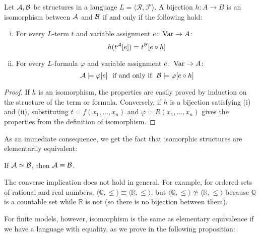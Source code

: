 \begin{proposition}
Let $\mathcal{A}, \mathcal{B}$ be structures in a language $L = \langle\mathcal{R}, \mathcal{F}\rangle$. A bijection $h\colon A \to B$ is an isomorphism between $\mathcal{A}$ and $\mathcal{B}$ if and only if the following hold:
\begin{enumerate}[(i)]
    \item For every $L$-term $t$ and variable assignment $e\colon \operatorname{Var} \to A$:
    $$
    h(t^{\mathcal{A}}[e]) = t^{\mathcal{B}}[e \circ h]
    $$
    \item For every $L$-formula $\varphi$ and variable assignment $e\colon \operatorname{Var} \to A$:
    $$
    \mathcal{A} \models \varphi[e]\ \text{ if and only if }\ \mathcal{B} \models \varphi[e \circ h]
    $$
\end{enumerate}
\end{proposition}
\begin{proof}
    If $h$ is an isomorphism, the properties are easily proved by induction on the structure of the term or formula. Conversely, if $h$ is a bijection satisfying (i) and (ii), substituting $t = f(x_1, \dots, x_n)$ and $\varphi = R(x_1, \dots, x_n)$ gives the properties from the definition of isomorphism.
\end{proof}

As an immediate consequence, we get the fact that isomorphic structures are elementarily equivalent:

\begin{corollary}\label{corollary:isomorphic-implies-elementarily-equivalent}
    If $\mathcal{A} \simeq \mathcal{B}$, then $\mathcal{A} \equiv \mathcal{B}$.
\end{corollary}

\begin{remark}
    The converse implication does not hold in general. For example, for ordered sets of rational and real numbers, $\langle\mathbb{Q}, \leq \rangle \equiv \langle\mathbb{R}, \leq \rangle$, but $\langle\mathbb{Q}, \leq \rangle \not\simeq \langle \mathbb{R}, \leq \rangle$ because $\mathbb{Q}$ is a countable set while $\mathbb{R}$ is not (so there is no bijection between them).
\end{remark}

For finite models, however, isomorphism is the same as elementary equivalence if we have a language with equality, as we prove in the following proposition:

